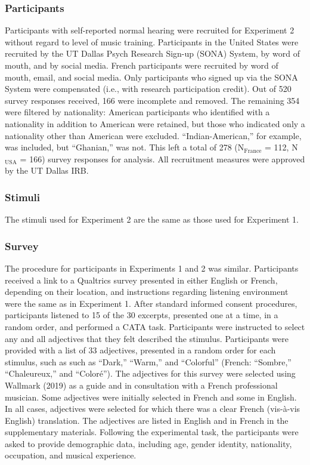 \documentclass[
  english,
  man,floatsintext]{apa6}
\begin{document}
\hypertarget{participants-2}{%
\subsubsection{Participants}\label{participants-2}}

Participants with self-reported normal hearing were recruited for Experiment 2 without regard to level of music training. Participants in the United States were recruited by the UT Dallas Psych Research Sign-up (SONA) System, by word of mouth, and by social media. French participants were recruited by word of mouth, email, and social media. Only participants who signed up via the SONA System were compensated (i.e., with research participation credit). Out of 520 survey responses received, 166 were incomplete and removed. The remaining 354 were filtered by nationality: American participants who identified with a nationality in addition to American were retained, but those who indicated only a nationality other than American were excluded. ``Indian-American,'' for example, was included, but ``Ghanian,'' was not. This left a total of 278 (N\(\mathrm{_{France}}\) = 112, N\(\mathrm{_{USA}}\) = 166) survey responses for analysis. All recruitment measures were approved by the UT Dallas IRB.

\hypertarget{stimuli-1}{%
\subsubsection{Stimuli}\label{stimuli-1}}

The stimuli used for Experiment 2 are the same as those used for Experiment 1.

\hypertarget{survey-1}{%
\subsubsection{Survey}\label{survey-1}}

The procedure for participants in Experiments 1 and 2 was similar. Participants received a link to a Qualtrics survey presented in either English or French, depending on their location, and instructions regarding listening environment were the same as in Experiment 1. After standard informed consent procedures, participants listened to 15 of the 30 excerpts, presented one at a time, in a random order, and performed a CATA task. Participants were instructed to select any and all adjectives that they felt described the stimulus. Participants were provided with a list of 33 adjectives, presented in a random order for each stimulus, such as such as ``Dark,'' ``Warm,'' and ``Colorful'' (French: ``Sombre,'' ``Chaleureux,'' and ``Coloré''). The adjectives for this survey were selected using Wallmark (2019) as a guide and in consultation with a French professional musician. Some adjectives were initially selected in French and some in English. In all cases, adjectives were selected for which there was a clear French (vis-à-vis English) translation. The adjectives are listed in English and in French in the supplementary materials. Following the experimental task, the participants were asked to provide demographic data, including age, gender identity, nationality, occupation, and musical experience.
\end{document}
